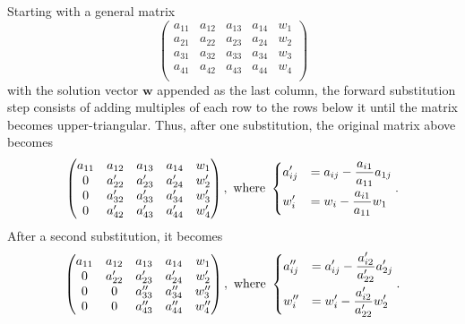 \documentclass{article}
\begin{document}
        Starting with a general matrix
        \begin{equation*}
            \begin{pmatrix}
                a_{11} & a_{12} & a_{13} & a_{14} & w_1 \\
                a_{21} & a_{22} & a_{23} & a_{24} & w_2 \\
                a_{31} & a_{32} & a_{33} & a_{34} & w_3 \\
                a_{41} & a_{42} & a_{43} & a_{44} & w_4 \\
            \end{pmatrix}
        \end{equation*}
        with the solution vector $\mathbf{w}$ appended as the last column, the forward substitution step consists of adding multiples of each row to the rows below it until the matrix becomes upper-triangular. Thus, after one substitution, the original matrix above becomes
        \begin{equation*}
            \begin{pmatrix}
                a_{11} & a_{12}  & a_{13}  & a_{14}  & w_1 \\
                0      & a'_{22} & a'_{23} & a'_{24} & w'_2 \\
                0      & a'_{32} & a'_{33} & a'_{34} & w'_3 \\
                0      & a'_{42} & a'_{43} & a'_{44} & w'_4 \\
            \end{pmatrix}, \text{ where }
            \begin{dcases}
                a'_{ij} &= a_{ij} - \frac{a_{i1}}{a_{11}} a_{1j} \\
                w'_i    &= w_i - \frac{a_{i1}}{a_{11}} w_1
            \end{dcases}.
        \end{equation*}
        After a second substitution, it becomes
        \begin{equation*}
            \begin{pmatrix}
                a_{11} & a_{12}  & a_{13}   & a_{14}   & w_1   \\
                0      & a'_{22} & a'_{23}  & a'_{24}  & w'_2  \\
                0      & 0       & a''_{33} & a''_{34} & w''_3 \\
                0      & 0       & a''_{43} & a''_{44} & w''_4 \\
            \end{pmatrix}, \text{ where }
            \begin{dcases}
                a''_{ij} &= a'_{ij} - \frac{a'_{i2}}{a'_{22}} a'_{2j} \\
                w''_i    &= w'_i - \frac{a'_{i2}}{a'_{22}} w'_2
            \end{dcases}.
        \end{equation*}
\end{document}
